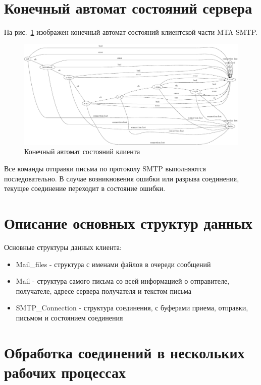 \documentclass[a4paper,12pt]{report}
\begin{document}
\section{Конечный автомат состояний сервера}

На рис.~\ref{fig:fsm} изображен конечный автомат состояний клиентской части MTA SMTP. 

\begin{figure}[h]
    \centering
    \includegraphics[width=\textwidth]{include/client_def_dot.pdf}
    \caption{Конечный автомат состояний клиента}
    \label{fig:fsm}
\end{figure}

Все команды отправки письма по протоколу SMTP выполняются последовательно. В случае возникновения ошибки или разрыва соединения, текущее соединение переходит в состояние ошибки.

\section{Описание основных структур данных}

 Основные структуры данных клиента:
\begin{itemize}
    \item Mail\_files - структура с именами файлов в очереди сообщений
    \item Mail - структура самого письма со всей информацией о отправителе, получателе, адресе сервера получателя и текстом письма
    \item SMTP\_Connection - структура соединения, с буферами приема, отправки, письмом и состоянием соединения
\end{itemize}

\section{Обработка соединений в нескольких рабочих процессах}
\end{document}
